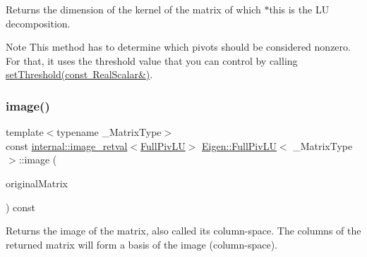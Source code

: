 \begin{DoxyReturn}{Returns}
the dimension of the kernel of the matrix of which $\ast$this is the LU decomposition.
\end{DoxyReturn}
\begin{DoxyNote}{Note}
This method has to determine which pivots should be considered nonzero. For that, it uses the threshold value that you can control by calling \mbox{\hyperlink{class_eigen_1_1_full_piv_l_u_a414592d82de98f5bd075965caf56d681}{set\+Threshold(const Real\+Scalar\&)}}. 
\end{DoxyNote}
\mbox{\label{class_eigen_1_1_full_piv_l_u_a0893985d2dab367baa6e57c6fd0c4956}} 
\subsubsection{\texorpdfstring{image()}{image()}}
{\footnotesize\ttfamily template$<$typename \+\_\+\+Matrix\+Type$>$ \\
const \mbox{\hyperlink{struct_eigen_1_1internal_1_1image__retval}{internal\+::image\+\_\+retval}}$<$\mbox{\hyperlink{class_eigen_1_1_full_piv_l_u}{Full\+Piv\+LU}}$>$ \mbox{\hyperlink{class_eigen_1_1_full_piv_l_u}{Eigen\+::\+Full\+Piv\+LU}}$<$ \+\_\+\+Matrix\+Type $>$\+::image (\begin{DoxyParamCaption}\item[{const Matrix\+Type \&}]{original\+Matrix }\end{DoxyParamCaption}) const\hspace{0.3cm}{\ttfamily [inline]}}

\begin{DoxyReturn}{Returns}
the image of the matrix, also called its column-\/space. The columns of the returned matrix will form a basis of the image (column-\/space).
\end{DoxyReturn}

